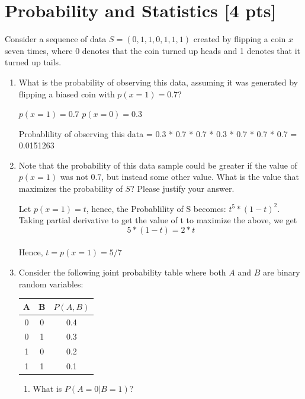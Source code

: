 \documentclass[a4paper]{article}
\theoremstyle{definition}
\newenvironment{soln}{
    \leavevmode\color{blue}\ignorespaces
}{}
\begin{document}
\section{Probability and Statistics [4 pts]}
Consider a sequence of data $S = (0, 1, 1, 0, 1, 1, 1)$ created by flipping a coin $x$ seven times, where 0 denotes that the coin turned up heads and 1 denotes that it turned up tails.
\begin{enumerate}
	\item 	What is the probability of observing this data, assuming it was generated by flipping a biased coin with $p(x=1) = 0.7$?
	    \begin{soln}  

			$p(x=1) = 0.7$
			$p(x=0) = 0.3$

			Probablility of observing this data =  0.3 * 0.7 * 0.7 * 0.3 * 0.7 * 0.7 * 0.7 = 0.0151263
	    \end{soln}

	\item 	Note that the probability of this data sample could be greater if the value of $p(x = 1)$ was not $0.7$, but instead some other value. What is the value that maximizes the probability of $S$? Please justify your answer.\\
	    \begin{soln}  

				Let  $p(x = 1) = t $, hence, the Probablility of S becomes:
				$ t^{5}*(1-t)^{2}.$
				\\Taking partial derivative to get the value of t to maximize the above, we get 
				$$
				 5*(1-t) = 2*t	
				$$
				\\Hence, $ t = p(x = 1) = 5/7 $
	   \end{soln}

	\item 	Consider the following joint probability table where both $A$ and $B$ are binary random variables: 
\begin{table}[htb]
\centering
	\begin{tabular}{ccc}\hline
	A & B & $P(A, B)$  \\\hline
	0 & 0 & 0.4 \\
	0 & 1 & 0.3 \\
	1 & 0 & 0.2 \\
	1 & 1 & 0.1 \\\hline
	\end{tabular}
\end{table}
\begin{enumerate}
	\item 	What is $P(A = 0 | B = 1)$?\\
	    \begin{soln}  


\end{soln}
\end{enumerate}
\end{enumerate}
\end{document}
